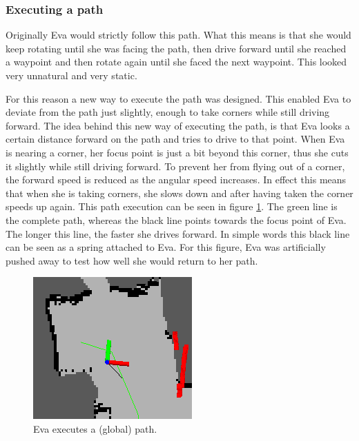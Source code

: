 \documentclass[project_eva.tex]{subfiles}
\begin{document}
\subsubsection*{Executing a path}
Originally Eva would strictly follow this path. What this means is that she would keep rotating until she was facing the 
path, then drive forward until she reached a waypoint and then rotate again until she faced the next waypoint. This looked very unnatural and very static. 

For this reason a new way to execute the path was designed. This enabled Eva to deviate from the path just slightly, enough 
to take corners while still driving forward. The idea behind this new way of executing the path, is that Eva looks a 
certain distance forward on the path and tries to drive to that point. When Eva is nearing a corner, her focus point is 
just a bit beyond this corner, thus she cuts it slightly while still driving forward. To prevent her from flying out of a 
corner, the forward speed is reduced as the angular speed increases. In effect this means that when she is taking corners, 
she slows down and after having taken the corner speeds up again. This path execution can be seen in figure 
\ref{fig:global_path}. The green line is the complete path, whereas the black line points towards the focus point of Eva. 
The longer this line, the faster she drives forward. In simple words this black line can be seen as a spring attached to 
Eva. For this figure, Eva was artificially pushed away to test how well she would return to her path.
\begin{figure}[ht!]
	\centering
	\mbox{\includegraphics[scale=0.4]{Images/global_path.png}}
	\caption{Eva executes a (global) path.}
	\label{fig:global_path}
\end{figure}
\end{document}
